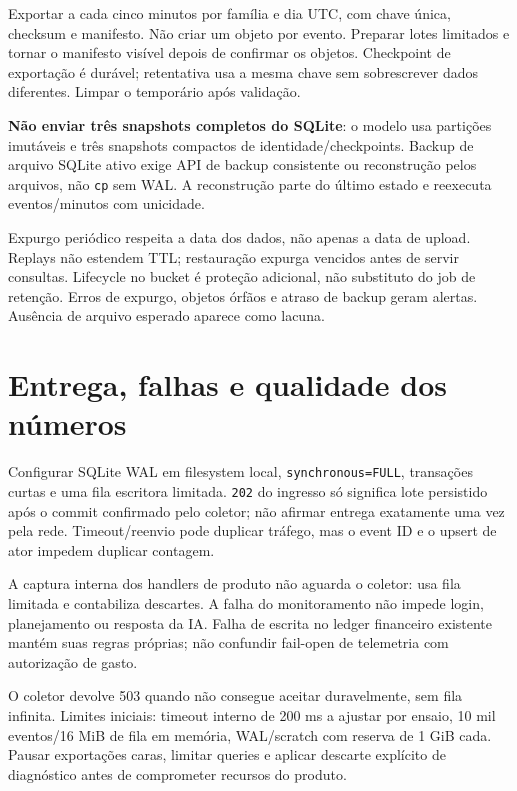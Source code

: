 \documentclass[10pt,a4paper]{article}
\begin{document}
Exportar a cada cinco minutos por família e dia UTC, com chave única,
checksum e manifesto. Não criar um objeto por evento. Preparar lotes
limitados e tornar o manifesto visível depois de confirmar os objetos.
Checkpoint de exportação é durável; retentativa usa a mesma chave sem
sobrescrever dados diferentes. Limpar o temporário após validação.

\textbf{Não enviar três snapshots completos do SQLite}: o modelo usa
partições imutáveis e três snapshots compactos de
identidade/checkpoints. Backup de arquivo SQLite ativo exige API de
backup consistente ou reconstrução pelos arquivos, não {\footnotesize\ttfamily\nolinkurl{cp}} sem
WAL. A reconstrução parte do último estado e reexecuta eventos/minutos
com unicidade.

Expurgo periódico respeita a data dos dados, não apenas a data de
upload. Replays não estendem TTL; restauração expurga vencidos antes de
servir consultas. Lifecycle no bucket é proteção adicional, não
substituto do job de retenção. Erros de expurgo, objetos órfãos e atraso
de backup geram alertas. Ausência de arquivo esperado aparece como
lacuna.

\clearpage
\section{Entrega, falhas e qualidade dos
números}\label{entrega-falhas-e-qualidade-dos-nuxfameros}

Configurar SQLite WAL em filesystem local, {\footnotesize\ttfamily\nolinkurl{synchronous=FULL}},
transações curtas e uma fila escritora limitada. {\footnotesize\ttfamily\nolinkurl{202}} do
ingresso só significa lote persistido após o commit confirmado pelo
coletor; não afirmar entrega exatamente uma vez pela rede.
Timeout/reenvio pode duplicar tráfego, mas o event ID e o upsert de ator
impedem duplicar contagem.

A captura interna dos handlers de produto não aguarda o coletor: usa
fila limitada e contabiliza descartes. A falha do monitoramento não
impede login, planejamento ou resposta da IA. Falha de escrita no ledger
financeiro existente mantém suas regras próprias; não confundir
fail-open de telemetria com autorização de gasto.

O coletor devolve 503 quando não consegue aceitar duravelmente, sem fila
infinita. Limites iniciais: timeout interno de 200 ms a ajustar por
ensaio, 10 mil eventos/16 MiB de fila em memória, WAL/scratch com
reserva de 1 GiB cada. Pausar exportações caras, limitar queries e
aplicar descarte explícito de diagnóstico antes de comprometer recursos
do produto.
\end{document}

